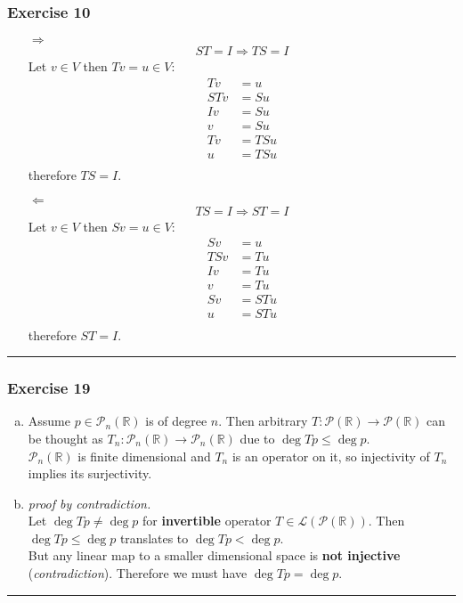 \documentclass[12pt, letterpaper]{scrartcl}
\newcommand{\R}{\mathbb{R}}
\begin{document}
\subsubsection*{Exercise 10}
\begin{itemize}
    \item[$\Longrightarrow$]\mbox{}\\
    \begin{align*}
        ST=I \Longrightarrow TS=I
    \end{align*}
    Let $v\in V$ then $Tv=u\in V$:
    \begin{align*}
        Tv&=u\\
        STv&=Su\\
        Iv&=Su\\
        v&=Su\\
        Tv&=TSu\\
        u&=TSu\\
    \end{align*}
    therefore $TS=I$.
    
    \item[$\Longleftarrow$]\mbox{}\\
    \begin{align*}
        TS=I \Longrightarrow ST=I
    \end{align*}
    Let $v\in V$ then $Sv=u\in V$:
    \begin{align*}
        Sv&=u\\
        TSv&=Tu\\
        Iv&=Tu\\
        v&=Tu\\
        Sv&=STu\\
        u&=STu\\
    \end{align*}
    therefore $ST=I$.

\end{itemize}
\vskip1mm\hrule

\subsubsection*{Exercise 19}
\begin{enumerate}[(a)]
    \item 

    Assume $p\in \mathcal{P}_n(\R)$ is of degree $n$. Then arbitrary $T:\mathcal{P}(\R)\rightarrow\mathcal{P}(\R)$ can be thought as $T_n:\mathcal{P}_n(\R)\rightarrow\mathcal{P}_n(\R)$ due to $\deg Tp\leq \deg p$.\\$\mathcal{P}_n(\R)$ is finite dimensional and $T_n$ is an operator on it, so injectivity of $T_n$ implies its surjectivity.
    
    \item \emph{proof by contradiction.}\\Let $\deg Tp \neq \deg p$ for \textbf{invertible} operator $T\in\mathcal{L}(\mathcal{P}(\R))$. Then $\deg Tp \leq \deg p$ translates to $\deg Tp < \deg p$.\\But any linear map to a smaller dimensional space is \textbf{not injective} (\emph{contradiction}). Therefore we must have $\deg Tp = \deg p$.
\end{enumerate}
\vskip1mm\hrule
\end{document}

